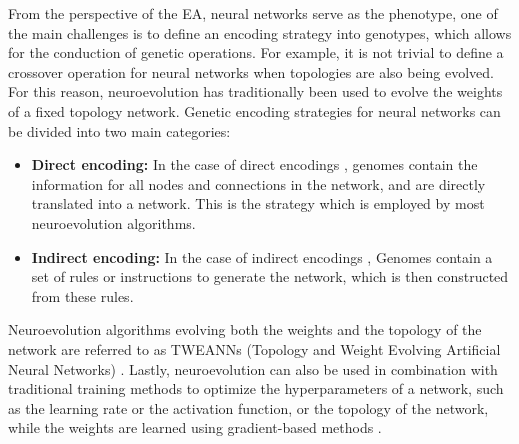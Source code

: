 From the perspective of the EA, neural networks serve as the phenotype, one of the main challenges is to define an encoding strategy into genotypes, which
allows for the conduction of genetic operations. For example, it is not trivial to define a crossover operation for neural networks when topologies are also
being evolved. For this reason, neuroevolution has traditionally  been used to evolve the weights of a fixed topology network. Genetic encoding strategies
for neural networks can be divided into two main categories:

\begin{itemize}
    \item \textbf{Direct encoding:} In the case of direct encodings \cite{neuroevolution_learning,neuroevolution_trends,neuroevolution_survey}, genomes contain the information for
        all nodes and connections in the network, and are directly translated into a network. This is the strategy which is employed by most neuroevolution algorithms.
    \item \textbf{Indirect encoding:} In the case of indirect encodings \cite{neuroevolution_learning,neuroevolution_trends,neuroevolution_survey}, Genomes contain a set of rules or
        instructions to generate the network, which is then constructed from these rules.
\end{itemize}

Neuroevolution algorithms evolving both the weights and the topology of the network are referred to as TWEANNs (Topology and Weight Evolving Artificial Neural Networks) \cite{neat}.
Lastly, neuroevolution can also be used in combination with traditional training methods to optimize the hyperparameters of a network, such as the learning rate or the
activation function, or the topology of the network, while the weights are learned using gradient-based methods \cite{neuroevolution_trends}.
